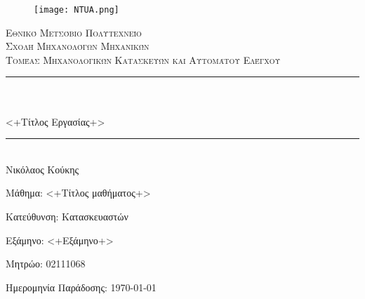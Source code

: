 \newcommand{\horrule}[1]{\rule{\linewidth}{#1}} %

\begin{titlepage}

\begin{center}
\begin{figure}[htpb]
    \begin{center}
        \texttt{[image: NTUA.png]} %
    \end{center}
\end{figure}

\normalfont \normalsize 
\textsc{Εθνικό Μετσόβιο Πολυτεχνείο} \\  %
\textsc{Σχολή Μηχανολόγων Μηχανικών} \\
\textsc{Τομέας Μηχανολογικών Κατασκευών και Αυτομάτου Ελέγχου} \\ [25pt] %
\horrule{0.5pt} \\[0.4cm] %
\\ <+Τίτλος Εργασίας+>\\
\horrule{2pt} \\[0.5cm] %
\vspace*{10mm}
\Large 
Νικόλαος Κούκης

\end{center}
\vfill
\large \normalfont
\begin{description*}
    \item[Mάθημα:] <+Τίτλος μαθήματος+>
    \item[Κατεύθυνση:] Κατασκευαστών
    \item[Εξάμηνο:] <+Εξάμηνο+> 
    \item[Μητρώο:] 02111068
    \item[Ημερομηνία Παράδοσης:] \today
\end{description*}

\end{titlepage}
